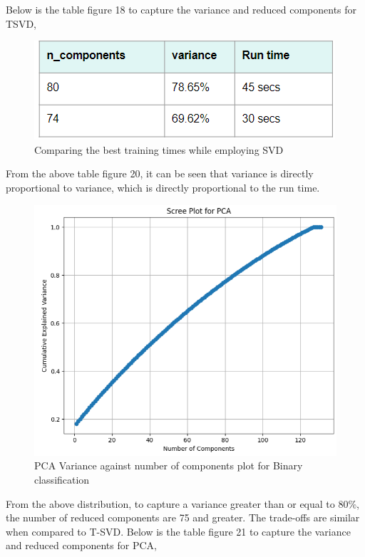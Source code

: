 \documentclass[journal,transmag]{J-NaNA}
\begin{document}
Below is the table figure 18 to capture the variance and reduced components for TSVD,
\begin{figure}[htbp]
\centering
\includegraphics[width=\linewidth]{svd-table.PNG} 
\caption{Comparing the best training times while employing SVD} 
\label{fig: SVD variance and time} %
\end{figure}
From the above table figure 20, it can be seen that variance is directly proportional to variance, which is directly proportional to the run time. 
\begin{figure}[htbp]
\centering
\includegraphics[width=\linewidth]{PCA-chchse.png} 
\caption{PCA Variance against number of components plot for Binary classification} 
\label{fig: PCA for binary classification} %
\end{figure}
From the above distribution, to capture a variance greater than or equal to 80\%, the number of reduced components are 75 and greater. The trade-offs are similar when compared to T-SVD. 
Below is the table figure 21 to capture the variance and reduced components for PCA,
\end{document}
